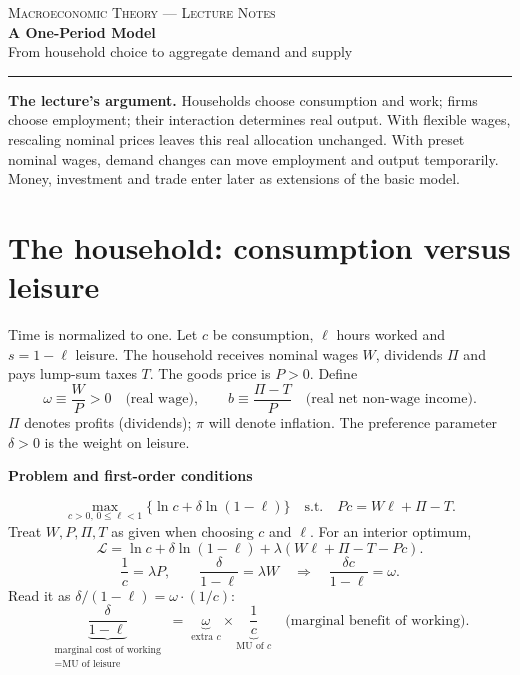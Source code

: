 \documentclass[11pt,letterpaper]{article}
\newcommand{\topic}[1]{\par\Needspace{4\baselineskip}\medskip\textbf{#1}\par\nobreak}
\newcommand{\w}{\omega}
\begin{document}
\begin{center}
  {\small\scshape Macroeconomic Theory --- Lecture Notes}\\[5pt]
  {\LARGE\bfseries A One-Period Model}\\[4pt]
  {\large From household choice to aggregate demand and supply}
\end{center}
\vspace{2pt}\hrule\vspace{5pt}

\textbf{The lecture's argument.} Households choose consumption and work; firms
choose employment; their interaction determines real output. With flexible wages,
rescaling nominal prices leaves this real allocation unchanged. With preset nominal
wages, demand changes can move employment and output temporarily. Money, investment
and trade enter later as extensions of the basic model.

\section{The household: consumption versus leisure}
Time is normalized to one. Let $c$ be consumption, $\ell$ hours worked and
$s=1-\ell$ leisure. The household receives nominal wages $W$, dividends $\Pi$
and pays lump-sum taxes $T$. The goods price is $P>0$. Define
\[
  \w\equiv\frac{W}{P}>0 \quad\text{(real wage)},\qquad
  b\equiv\frac{\Pi-T}{P}\quad\text{(real net non-wage income)}.
\]
$\Pi$ denotes profits (dividends); $\pi$ will denote inflation. The preference
parameter $\delta>0$ is the weight on leisure.

\topic{Problem and first-order conditions}
\begin{equation}
  \max_{c>0,\,0\leq\ell<1}\{\ln c+\delta\ln(1-\ell)\}
  \quad\text{s.t.}\quad Pc=W\ell+\Pi-T.
  \label{eq:household}
\end{equation}
Treat $W,P,\Pi,T$ as given when choosing $c$ and $\ell$. For an interior optimum,
\[
  \mathcal L=\ln c+\delta\ln(1-\ell)
       +\lambda(W\ell+\Pi-T-Pc).
\]
\begin{equation}
  \frac{1}{c}=\lambda P,\qquad
  \frac{\delta}{1-\ell}=\lambda W
  \quad\Longrightarrow\quad
  \boxed{\frac{\delta c}{1-\ell}=\w.}
  \label{eq:mrs}
\end{equation}
Read it as $\delta/(1-\ell)=\w\cdot(1/c)$:
\[
 \underbrace{\frac{\delta}{1-\ell}}_{\substack{\text{marginal cost of working}\\=\text{MU of leisure}}}
 \;=\;
 \underbrace{\w}_{\text{extra }c}\times\underbrace{\frac1c}_{\text{MU of }c}
 \quad\text{(marginal benefit of working)}.
\]
\end{document}

